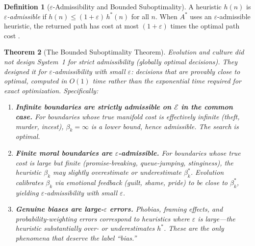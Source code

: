 \documentclass[12pt]{article}
\newtheorem{theorem}{Theorem}[section]
\theoremstyle{definition}
\newtheorem{definition}[theorem]{Definition}
\theoremstyle{remark}
\newcommand{\E}{\mathcal{E}}               %
\begin{document}
\begin{definition}[$\varepsilon$-Admissibility and Bounded Suboptimality]
\label{def:epsilon_admissible}
A heuristic $h(n)$ is \emph{$\varepsilon$-admissible} if $h(n) \leq (1 + \varepsilon)\, h^*(n)$ for all $n$.  When $A^*$ uses an $\varepsilon$-admissible heuristic, the returned path has cost at most $(1 + \varepsilon)$ times the optimal path cost \cite{hart1968}.
\end{definition}

\begin{theorem}[The Bounded Suboptimality Theorem]
\label{thm:bounded_suboptimality}
Evolution and culture did not design System~1 for strict admissibility (globally optimal decisions).  They designed it for \emph{$\varepsilon$-admissibility with small $\varepsilon$}: decisions that are provably close to optimal, computed in $O(1)$ time rather than the exponential time required for exact optimization.  Specifically:
\begin{enumerate}
    \item \textbf{Infinite boundaries are strictly admissible on $\E$ in the common case.}  For boundaries whose true manifold cost is effectively infinite (theft, murder, incest), $\beta_k = \infty$ is a lower bound, hence admissible.  The search is optimal.
    \item \textbf{Finite moral boundaries are $\varepsilon$-admissible.}  For boundaries whose true cost is large but finite (promise-breaking, queue-jumping, stinginess), the heuristic $\beta_k$ may slightly overestimate or underestimate $\beta_k^*$.  Evolution calibrates $\beta_k$ via emotional feedback (guilt, shame, pride) to be close to $\beta_k^*$, yielding $\varepsilon$-admissibility with small $\varepsilon$.
    \item \textbf{Genuine biases are large-$\varepsilon$ errors.}  Phobias, framing effects, and probability-weighting errors correspond to heuristics where $\varepsilon$ is large---the heuristic substantially over- or underestimates $h^*$.  These are the \emph{only} phenomena that deserve the label ``bias.''
\end{enumerate}
\end{theorem}
\end{document}
